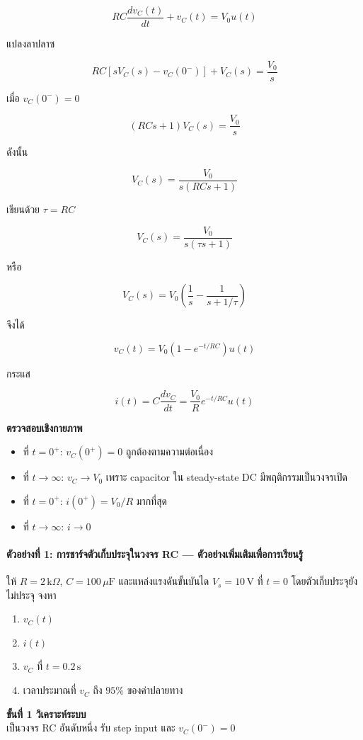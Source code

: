 \[
RC\frac{dv_C(t)}{dt}+v_C(t)=V_0u(t)
\]

แปลงลาปลาซ

\[
RC\left[sV_C(s)-v_C(0^-)\right]+V_C(s)=\frac{V_0}{s}
\]

เมื่อ $v_C(0^-)=0$

\[
(RCs+1)V_C(s)=\frac{V_0}{s}
\]

ดังนั้น

\[
V_C(s)=\frac{V_0}{s(RCs+1)}
\]

เขียนด้วย $\tau=RC$

\[
V_C(s)=\frac{V_0}{s(\tau s+1)}
\]

หรือ

\[
V_C(s)=V_0\left(\frac{1}{s}-\frac{1}{s+1/\tau}\right)
\]

จึงได้

\[
\boxed{v_C(t)=V_0\left(1-e^{-t/RC}\right)u(t)}
\]

กระแส

\[
i(t)=C\frac{dv_C}{dt}=\frac{V_0}{R}e^{-t/RC}u(t)
\]

\textbf{ตรวจสอบเชิงกายภาพ}

\begin{itemize}
    \item ที่ $t=0^+$: $v_C(0^+)=0$ ถูกต้องตามความต่อเนื่อง
    \item ที่ $t\to\infty$: $v_C\to V_0$ เพราะ capacitor ใน steady-state DC มีพฤติกรรมเป็นวงจรเปิด
    \item ที่ $t=0^+$: $i(0^+)=V_0/R$ มากที่สุด
    \item ที่ $t\to\infty$: $i\to0$
\end{itemize}

\paragraph{ตัวอย่างที่ 1: การชาร์จตัวเก็บประจุในวงจร RC — ตัวอย่างเพิ่มเติมเพื่อการเรียนรู้}

ให้ $R=2\,\text{k}\Omega$, $C=100\,\mu\text{F}$ และแหล่งแรงดันขั้นบันได $V_s=10\,\text{V}$ ที่ $t=0$ โดยตัวเก็บประจุยังไม่ประจุ จงหา

\begin{enumerate}
    \item $v_C(t)$
    \item $i(t)$
    \item $v_C$ ที่ $t=0.2\,\text{s}$
    \item เวลาประมาณที่ $v_C$ ถึง $95\%$ ของค่าปลายทาง
\end{enumerate}

\textbf{ขั้นที่ 1 วิเคราะห์ระบบ}\\
เป็นวงจร RC อันดับหนึ่ง รับ step input และ $v_C(0^-)=0$


